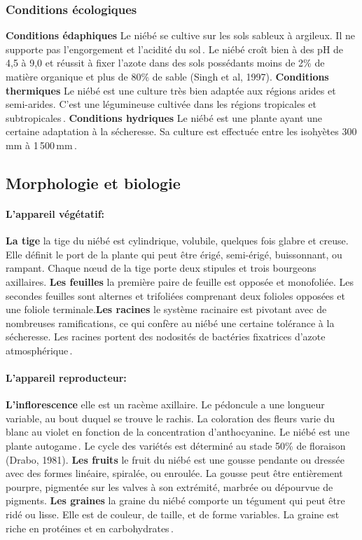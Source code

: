 \documentclass[a4paper,11pt]{article}
\begin{document}
\subsubsection{Conditions écologiques}

\textbf{Conditions édaphiques} Le niébé se cultive sur les sols
sableux à argileux. Il ne supporte pas l’engorgement et l’acidité du
sol\,\cite{Doggett_1988}. Le niébé croît bien à des pH de 4,5 à 9,0 et
réussit à fixer l’azote dans des sols possédants moins de 2\% de
matière organique et plus de 80\% de sable (Singh et al,
1997). \textbf{Conditions thermiques} Le niébé est
une culture très bien adaptée aux régions arides et semi-arides. C’est
une légumineuse cultivée dans les régions tropicales et
subtropicales\,\cite{Doggett_1988}. \textbf{Conditions hydriques} Le
niébé est une plante ayant une certaine adaptation à la sécheresse. Sa
culture est effectuée entre les isohyètes 300\,mm à
1\,500\,mm\,\cite{Doggett_1988}.

\subsection{Morphologie et biologie}

  
\paragraph{L’appareil végétatif:}

\textbf{La tige} la tige du niébé est cylindrique, volubile, quelques fois
glabre et creuse. Elle définit le port de la plante qui peut être
érigé, semi-érigé, buissonnant, ou rampant. Chaque nœud de la tige
porte deux stipules et trois bourgeons axillaires. \textbf{Les feuilles} la
première paire de feuille est opposée et monofoliée. Les secondes
feuilles sont alternes et trifoliées comprenant deux folioles opposées
et une foliole terminale.\textbf{Les racines} le système racinaire est
pivotant avec de nombreuses ramifications, ce qui confère au niébé une
certaine tolérance à la sécheresse. Les racines portent des nodosités
de bactéries fixatrices d’azote atmosphérique\,\cite{Doggett_1988}.



\paragraph{L’appareil reproducteur:}

\textbf{L’inflorescence} elle est un racème axillaire. Le pédoncule a
une longueur variable, au bout duquel se trouve le rachis. La
coloration des fleurs varie du blanc au violet en fonction de la
concentration d’anthocyanine. Le niébé est une plante
autogame\,\cite{Fery}. Le cycle des variétés est déterminé au stade
50\% de floraison (Drabo, 1981). \textbf{Les fruits} le fruit du niébé
est une gousse pendante ou dressée avec des formes linéaire, spiralée,
ou enroulée. La gousse peut être entièrement pourpre, pigmentée sur
les valves à son extrémité, marbrée ou dépourvue de
pigments. \textbf{Les graines} la graine du niébé comporte un tégument
qui peut être ridé ou lisse. Elle est de couleur, de taille, et de
forme variables. La graine est riche en protéines et en
carbohydrates\,\cite{Doggett_1988}.
\end{document}
